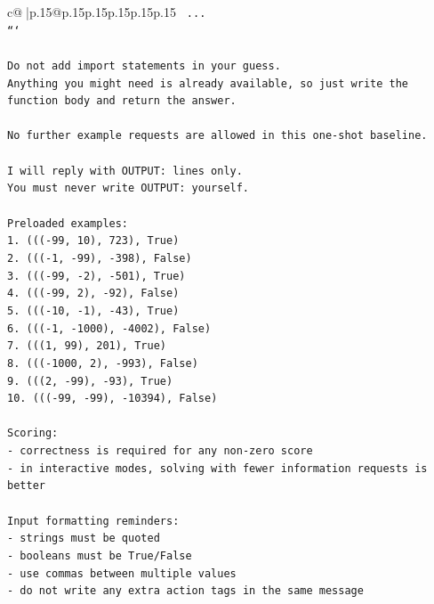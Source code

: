 \documentclass{article}
\begin{document}
{\begin{supertabular}{c@{$\;$}|p{.15\linewidth}@{}p{.15\linewidth}p{.15\linewidth}p{.15\linewidth}p{.15\linewidth}p{.15\linewidth}}
{{{\texttt{    ...} \\
\texttt{```} \\
\\ 
\texttt{Do not add import statements in your guess.} \\
\texttt{Anything you might need is already available, so just write the function body and return the answer.} \\
\\ 
\texttt{No further example requests are allowed in this one{-}shot baseline.} \\
\\ 
\texttt{I will reply with OUTPUT: lines only.} \\
\texttt{You must never write OUTPUT: yourself.} \\
\\ 
\texttt{Preloaded examples:} \\
\texttt{1. ((({-}99, 10), 723), True)} \\
\texttt{2. ((({-}1, {-}99), {-}398), False)} \\
\texttt{3. ((({-}99, {-}2), {-}501), True)} \\
\texttt{4. ((({-}99, 2), {-}92), False)} \\
\texttt{5. ((({-}10, {-}1), {-}43), True)} \\
\texttt{6. ((({-}1, {-}1000), {-}4002), False)} \\
\texttt{7. (((1, 99), 201), True)} \\
\texttt{8. ((({-}1000, 2), {-}993), False)} \\
\texttt{9. (((2, {-}99), {-}93), True)} \\
\texttt{10. ((({-}99, {-}99), {-}10394), False)} \\
\\ 
\texttt{Scoring:} \\
\texttt{{-} correctness is required for any non{-}zero score} \\
\texttt{{-} in interactive modes, solving with fewer information requests is better} \\
\\ 
\texttt{Input formatting reminders:} \\
\texttt{{-} strings must be quoted} \\
\texttt{{-} booleans must be True/False} \\
\texttt{{-} use commas between multiple values} \\
\texttt{{-} do not write any extra action tags in the same message} \\
}}}
\end{supertabular}}
\end{document}
